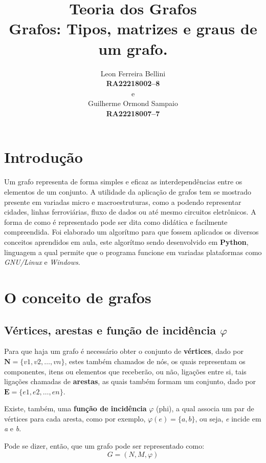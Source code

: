 \documentclass[a4paper, 12pt]{article}
\begin{document}
\title{\textbf{Teoria dos Grafos}\\ \small{Grafos: Tipos, matrizes e graus de um grafo.}}
\author{Leon Ferreira Bellini\\
	\small{\textbf{RA\@ 22218002--8}}\\
	e\\
   Guilherme Ormond Sampaio\\
   \small{\textbf{RA\@ 22218007--7}}
}
\date{}
\maketitle
\section{Introdução}
Um grafo representa de forma simples e eficaz as interdependências entre os elementos de um conjunto. A utilidade da aplicação de grafos tem se mostrado presente em variadas micro e macroestruturas, como a podendo representar cidades, linhas ferroviárias, fluxo de dados ou até mesmo circuitos eletrônicos. A forma de como é representado pode ser dita como didática e facilmente compreendida. Foi elaborado um algorítmo para que fossem aplicados os diversos conceitos aprendidos em aula, este algorítmo sendo desenvolvido em \textbf{Python}, linguagem a qual permite que o programa funcione em variadas plataformas como \textit{GNU/Linux} e \textit{Windows}. 
\section{O conceito de grafos}
\subsection{Vértices, arestas e função de incidência {$\varphi$}}
Para que haja um grafo é necessário obter o conjunto de \textbf{vértices}, dado por $\textbf{N} = \{v1, v2, \ldots, vn\}$, estes também chamados de nós, os quais representam os componentes, itens ou elementos que receberão, ou não, ligações entre si, tais ligações chamadas de \textbf{arestas}, as quais também formam um conjunto, dado por $\textbf{E} = \{e1, e2, \ldots, en\}$.

Existe, também, uma \textbf{função de incidência} $ \varphi $ (phi), a qual associa um par de vértices para cada aresta, como por exemplo, $ \varphi(e) = \{ a, b \}$, ou seja, \textit{e} incide em \textit{a} e \textit{b}.

Pode se dizer, então, que um grafo pode ser representado como: \[ G = (N, M, \varphi) \]
\end{document}
